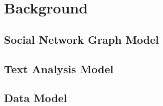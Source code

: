 \section{Background \label{sec:background}}

\subsection{Social Network Graph Model \label{sec:graph-background}}



\subsection{Text Analysis Model \label{sec:text-background}}



\subsection{Data Model \label{sec:data-background}}


